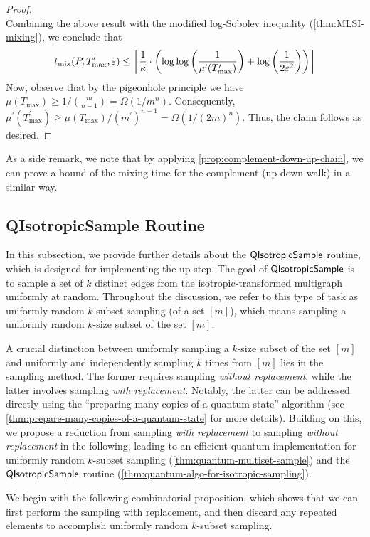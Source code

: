 \documentclass[11pt]{article}
\newcommand{\ceil}[1]{\left\lceil #1 \right\rceil}
\newcommand{\paren}[1]{\left( #1 \right)}
\newcommand{\parens}[1]{( #1 )}
\begin{document}
{\begin{proof}
\[\]
Combining the above result with the modified log-Sobolev inequality (\cref{thm:MLSI-mixing}), we conclude that 
\begin{equation}
   t_{\mix}\parens{P,T^\prime_{\max},\varepsilon}\leq \ceil{\frac{1}{\kappa}\cdot\paren{\log\log\paren{\frac{1}{\mu^\prime \parens{T^\prime_{\max}}}}+\log\paren{\frac{1}{2\varepsilon^2} }}}
\end{equation}
     Now, observe that by the pigeonhole principle we have $\mu(T_{\max}) \geq 1/\binom{m}{n-1} = \Omega(1/m^n)$. Consequently,
$\mu^\prime\parens{T^\prime_{\max}}\geq \mu\parens{T _{\max}}/(m ^\prime)^{n-1}=\Omega\parens{1/(2m)^n}
$. Thus, the claim follows as desired.
\end{proof}

As a side remark,  we note that by applying \cref{prop:complement-down-up-chain}, 
we can prove a bound of the mixing time for the complement (up-down walk) in a similar way.

\subsection{QIsotropicSample Routine}
In this subsection, we provide further details about the $\mathsf{QIsotropicSample}$ routine,
which is designed for implementing the up-step.
The goal of $\mathsf{QIsotropicSample}$ is to sample a set of $k$ distinct edges from the
isotropic-transformed multigraph uniformly at random.
Throughout the discussion, we refer to this type of task as uniformly random
$k$-subset sampling (of a set $[m]$), which means sampling a uniformly random
$k$-size subset of the set $[m]$.

A crucial distinction between uniformly sampling a $k$-size subset of the set
$[m]$ and uniformly and independently sampling $k$ times from $[m]$ lies in the
sampling method.
The former requires sampling \emph{without replacement}, while the latter
involves sampling \emph{with replacement}.
Notably, the latter can be addressed directly using the ``preparing many copies
of a quantum state'' algorithm (see
\cref{thm:prepare-many-copies-of-a-quantum-state} for more details).
Building on this, we propose a reduction from sampling \emph{with replacement}
to sampling \emph{without replacement} in the following, leading to an efficient
quantum implementation for uniformly random $k$-subset sampling
(\cref{thm:quantum-multiset-sample}) and the $\mathsf{QIsotropicSample}$ routine
(\cref{thm:quantum-algo-for-isotropic-sampling}).

We begin with the following combinatorial proposition, 
which shows that we can first perform the sampling with replacement, 
and then discard any repeated elements to accomplish 
uniformly random $k$-subset sampling.

}
\end{document}
